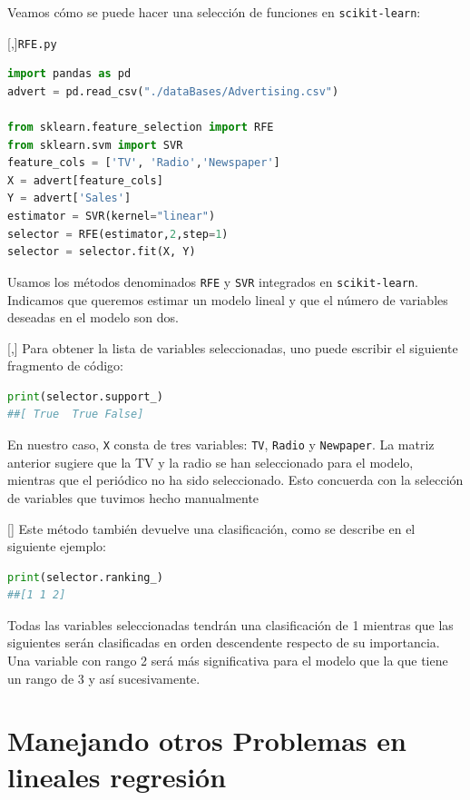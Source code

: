 Veamos cómo se puede hacer una selección de funciones en \texttt{scikit-learn}:

[,]{\texttt{RFE.py}}
\begin{lstlisting}[language=Python]
import pandas as pd
advert = pd.read_csv("./dataBases/Advertising.csv")

from sklearn.feature_selection import RFE
from sklearn.svm import SVR
feature_cols = ['TV', 'Radio','Newspaper']
X = advert[feature_cols]
Y = advert['Sales']
estimator = SVR(kernel="linear")
selector = RFE(estimator,2,step=1)
selector = selector.fit(X, Y)
\end{lstlisting}


Usamos los métodos denominados \texttt{RFE} y \texttt{SVR} integrados en \texttt{scikit-learn}. Indicamos que
queremos estimar un modelo lineal y que el número de variables deseadas en el modelo son dos.

[,]{}
Para obtener la lista de variables seleccionadas, uno puede escribir el siguiente fragmento de código:
\begin{lstlisting}[language=Python]
print(selector.support_)
##[ True  True False]
\end{lstlisting}


En nuestro caso, \texttt{X} consta de tres variables: \texttt{TV}, \texttt{Radio} y \texttt{Newpaper}. La matriz anterior sugiere que la TV y la radio se han seleccionado para el modelo, mientras que
el periódico no ha sido seleccionado. Esto concuerda con la selección de variables que tuvimos hecho manualmente

[]
Este método también devuelve una clasificación, como se describe en el siguiente ejemplo:
\begin{lstlisting}[language=Python]
print(selector.ranking_)
##[1 1 2]
\end{lstlisting}



\begin{rem}
 Todas las variables seleccionadas tendrán una clasificación de 1 mientras que las siguientes serán
clasificadas en orden descendente respecto de su importancia. Una variable con rango 2 será más
significativa para el modelo que la que tiene un rango de 3 y así sucesivamente.
\end{rem}



\section{Manejando otros Problemas en lineales regresión}

